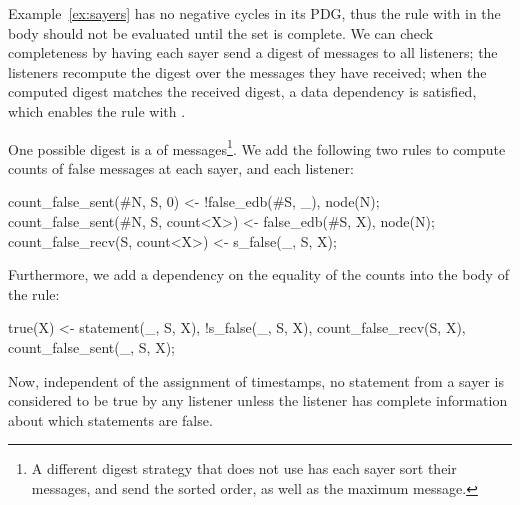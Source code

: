 Example~\ref{ex:sayers} has no negative cycles in its PDG, thus the rule with  in the body should not be evaluated until the  set is complete.  We can check completeness by having each sayer send a digest of  messages to all listeners; the listeners recompute the digest over the  messages they have received; when the computed digest matches the received digest, a data dependency is satisfied, which enables the rule with .



One possible digest is a  of  messages\footnote{A different digest strategy that does not use  has each sayer sort their messages, and send the sorted order, as well as the maximum message.}.  We add the following two rules to compute counts of false messages at each sayer, and each listener:

\begin{Dedalus}
count_false_sent(#N, S, 0) <- !false_edb(#S, _), node(N);
count_false_sent(#N, S, count<X>) <- false_edb(#S, X),
                                     node(N);
count_false_recv(S, count<X>) <- s_false(_, S, X);
\end{Dedalus}

Furthermore, we add a dependency on the equality of the counts into the body of the  rule:

\begin{Dedalus}
true(X) <- statement(_, S, X), !s_false(_, S, X),
           count_false_recv(S, X),
           count_false_sent(_, S, X);
\end{Dedalus}

Now, independent of the assignment of timestamps, no statement from a sayer  is considered to be true by any listener unless the listener has complete information about which statements are false.

